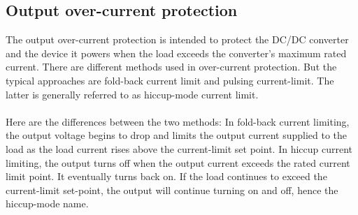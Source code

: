 

\subsection{Output over-current protection}

The output over-current protection is intended to protect the DC/DC converter and the device it powers when the load exceeds the converter’s maximum rated current. There are different methods used in over-current protection. But the typical approaches are fold-back current limit and pulsing current-limit. The latter is generally referred to as hiccup-mode current limit.
\\ \\
Here are the differences between the two methods: In fold-back current limiting, the output voltage begins to drop and limits the output current supplied to the load as the load current rises above the current-limit set point. In hiccup current limiting, the output turns off when the output current exceeds the rated current limit point. It eventually turns back on. If the load continues to exceed the current-limit set-point, the output will continue turning on and off, hence the hiccup-mode name.
\\ \\
